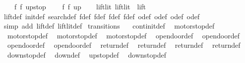 \begin{isabellebody}
\ \ \ \ {\isacharparenleft}{\isacharparenleft}f{}{\isacharcomma}\ f{}{\isacharparenright}{\isacharcomma}\ up{}{}stop{\isacharparenright}{\isacharcomma}\isanewline
\ \ \ \ {\isacharparenleft}{\isacharparenleft}f{}{\isacharcomma}\ f{}{\isacharparenright}{\isacharcomma}\ up{}{}{\isacharparenright}\isanewline
\ \ {\isacharbar}{\isacharbraceright}{\isachardoublequoteclose}\isanewline
\isanewline
\isanewline
{}\isamarkupfalse%
\ lift{\isacharunderscore}lit{\isacharcolon}\ {\isachardoublequoteopen}lift{\isacharunderscore}lit\ {\isacharequal}\ lift{\isachardoublequoteclose}\isanewline
%
\isadelimproof
\ \ %
\endisadelimproof
%
\isatagproof
{}\isamarkupfalse%
\ lift{\isacharunderscore}def\ init{\isacharunderscore}def\ search{\isacharunderscore}def\ f{}{\isacharunderscore}def\ f{}{\isacharunderscore}def\ f{}{\isacharunderscore}def\ f{}{\isacharunderscore}def\ o{}{\isacharunderscore}def\ o{}{\isacharunderscore}def\ o{}{\isacharunderscore}def\ o{}{\isacharunderscore}def\isanewline
\ \ \isamarkupfalse%
\ {\isacharparenleft}simp\ add{\isacharcolon}\ lift{\isacharunderscore}def\ lift{\isacharunderscore}lit{\isacharunderscore}def{\isacharparenright}%
\endisatagproof
{\isafoldproof}%
%
\isadelimproof
\isanewline
%
\endisadelimproof
\isanewline
{}\isamarkupfalse%
\ transitions\ {\isacharequal}\isanewline
\ \ continit{\isacharunderscore}def\isanewline
\ \ motorstop{}{\isacharunderscore}def\isanewline
\ \ motorstop{}{\isacharunderscore}def\isanewline
\ \ motorstop{}{\isacharunderscore}def\isanewline
\ \ motorstop{}{\isacharunderscore}def\isanewline
\ \ opendoor{}{\isacharunderscore}def\isanewline
\ \ opendoor{}{\isacharunderscore}def\isanewline
\ \ opendoor{}{\isacharunderscore}def\isanewline
\ \ opendoor{}{\isacharunderscore}def\isanewline
\ \ return{}{\isacharunderscore}def\isanewline
\ \ return{}{\isacharunderscore}def\isanewline
\ \ return{}{\isacharunderscore}def\isanewline
\ \ return{}{\isacharunderscore}def\isanewline
\ \ down{}{}stop{\isacharunderscore}def\isanewline
\ \ down{}{}{\isacharunderscore}def\isanewline
\ \ up{}{}stop{\isacharunderscore}def\isanewline
\ \ down{}{}stop{\isacharunderscore}def\isanewline

\end{isabellebody}
